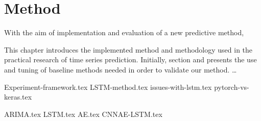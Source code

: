 \chapter{Method}
\label{section:Method}

With the aim of implementation and evaluation of a new predictive method,

This chapter introduces the implemented method and methodology used in the practical research of time series prediction.
Initially, section  and  presents the use and tuning of baseline methods needed in order to validate our method.
\dots

{Experiment-framework.tex}
{LSTM-method.tex}
{issues-with-lstm.tex}
{pytorch-vs-keras.tex}


{ARIMA.tex}
{LSTM.tex}
{AE.tex}
{CNNAE-LSTM.tex}
